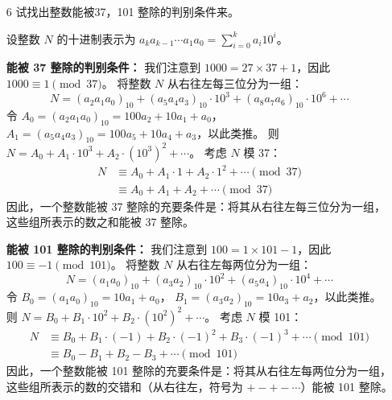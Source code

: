\begin{enumerate}
\begin{proof}
        因此，$a \equiv 0 \pmod{11}$ 当且仅当 $\sum_{i=0}^n (-1)^i a_i \equiv 0 \pmod{11}$。

        证毕。
    \end{proof}
    \item[6] 试找出整数能被37，101 整除的判别条件来。

    \begin{solution}
        设整数 $N$ 的十进制表示为 $a_k a_{k-1} \cdots a_1 a_0 = \sum_{i=0}^k a_i 10^i$。

        \textbf{能被 37 整除的判别条件：}
        我们注意到 $1000 = 27 \times 37 + 1$，因此 $1000 \equiv 1 \pmod{37}$。
        将整数 $N$ 从右往左每三位分为一组：
        \[ N = (a_2 a_1 a_0)_{10} + (a_5 a_4 a_3)_{10} \cdot 10^3 + (a_8 a_7 a_6)_{10} \cdot 10^6 + \cdots \]
        令 $A_0 = (a_2 a_1 a_0)_{10} = 100a_2 + 10a_1 + a_0$，
        $A_1 = (a_5 a_4 a_3)_{10} = 100a_5 + 10a_4 + a_3$，以此类推。
        则 $N = A_0 + A_1 \cdot 10^3 + A_2 \cdot (10^3)^2 + \cdots$。
        考虑 $N$ 模 37：
        \begin{align*}
            N &\equiv A_0 + A_1 \cdot 1 + A_2 \cdot 1^2 + \cdots \pmod{37} \\
            &\equiv A_0 + A_1 + A_2 + \cdots \pmod{37}
        \end{align*}
        因此，一个整数能被 37 整除的充要条件是：将其从右往左每三位分为一组，这些组所表示的数之和能被 37 整除。

        \textbf{能被 101 整除的判别条件：}
        我们注意到 $100 = 1 \times 101 - 1$，因此 $100 \equiv -1 \pmod{101}$。
        将整数 $N$ 从右往左每两位分为一组：
        \[ N = (a_1 a_0)_{10} + (a_3 a_2)_{10} \cdot 10^2 + (a_5 a_4)_{10} \cdot 10^4 + \cdots \]
        令 $B_0 = (a_1 a_0)_{10} = 10a_1 + a_0$，
        $B_1 = (a_3 a_2)_{10} = 10a_3 + a_2$，以此类推。
        则 $N = B_0 + B_1 \cdot 10^2 + B_2 \cdot (10^2)^2 + \cdots$。
        考虑 $N$ 模 101：
        \begin{align*}
            N &\equiv B_0 + B_1 \cdot (-1) + B_2 \cdot (-1)^2 + B_3 \cdot (-1)^3 + \cdots \pmod{101} \\
            &\equiv B_0 - B_1 + B_2 - B_3 + \cdots \pmod{101}
        \end{align*}
        因此，一个整数能被 101 整除的充要条件是：将其从右往左每两位分为一组，这些组所表示的数的交错和（从右往左，符号为 $+ - + - \cdots$）能被 101 整除。
    \end{solution}
\end{enumerate}